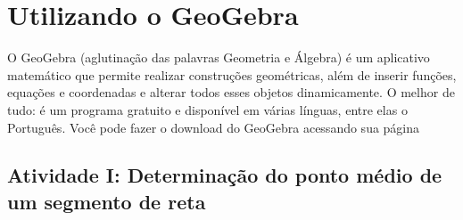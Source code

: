 \documentclass[11pt,a4paper]{article}
\begin{document}
\newpage
\section{Utilizando o GeoGebra}
O GeoGebra (aglutinação das palavras Geometria e Álgebra) é um aplicativo matemático que permite realizar construções geométricas, além de inserir funções, equações e coordenadas e alterar todos esses objetos dinamicamente. O melhor de tudo: é um programa gratuito e disponível em várias línguas, entre elas o Português.
Você pode fazer o download do GeoGebra acessando sua página \href{https://www.geogebra.org/}{{\color{blue}{clicando aqui}}}

\subsection{Atividade I: Determinação do ponto médio de um segmento de reta}
\end{document}
